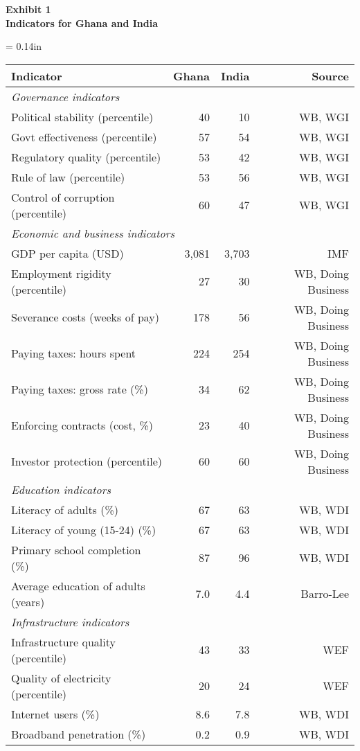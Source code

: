 \documentclass[12pt]{article}
\begin{document}
\pagebreak
%
{\bf Exhibit 1 \\
Indicators for Ghana and India}
\begin{center}
\tabcolsep = 0.14in
\begin{tabular}{lrrr}
\toprule
Indicator   &  Ghana    &  India   &  Source  \\

\midrule
\multicolumn{3}{l}{\it Governance indicators\/} \\
Political stability (percentile) & 40    &    10  & WB, WGI \\
Govt effectiveness (percentile)  & 57  & 54  & WB, WGI \\
Regulatory quality (percentile)  & 53  & 42  & WB, WGI \\
Rule of law (percentile)         & 53  & 56  & WB, WGI \\
Control of corruption (percentile)& 60 & 47  & WB, WGI \\

\midrule
\multicolumn{4}{l}{\it Economic and business indicators\/} \\
GDP per capita (USD)        &  3,081 & 3,703 &  IMF \\
Employment rigidity (percentile)   & 27 & 30 & WB, Doing Business \\
Severance costs (weeks of pay) & 178  & 56 & WB, Doing Business \\
Paying taxes:  hours spent     & 224  & 254 & WB, Doing Business \\
Paying taxes:  gross rate (\%) &  34  &  62 & WB, Doing Business \\
Enforcing contracts (cost, \%) &  23  &  40 & WB, Doing Business \\
Investor protection (percentile)    &  60  &  60 & WB, Doing Business \\

\midrule
\multicolumn{4}{l}{\it Education indicators\/} \\
Literacy of adults  (\%)       &    67     &  63   &  WB, WDI \\
Literacy of young (15-24)  (\%) &    67     &  63  & WB, WDI  \\
Primary school completion (\%)  & 87    & 96    & WB, WDI  \\
Average education of adults (years)  & 7.0 & 4.4 & Barro-Lee \\

\midrule
\multicolumn{4}{l}{\it Infrastructure indicators\/} \\
Infrastructure quality (percentile) & 43 & 33 &  WEF \\
Quality of electricity (percentile)  &  20 & 24  & WEF \\
Internet users (\%)   & 8.6 & 7.8 & WB, WDI \\
Broadband penetration (\%) &  0.2 & 0.9 & WB, WDI \\

\bottomrule
\end{tabular}
\end{center}
\end{document}
